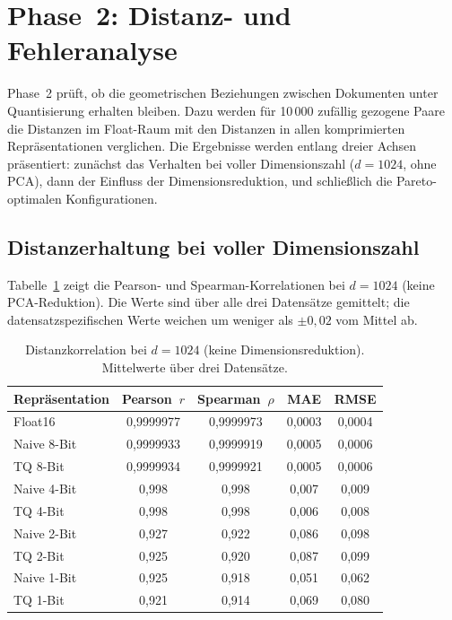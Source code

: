 \section{Phase~2: Distanz- und Fehleranalyse}
\label{sec:ergebnisse_phase2}
%
Phase~2 prüft, ob die geometrischen Beziehungen zwischen Dokumenten unter Quantisierung erhalten bleiben.
Dazu werden für 10\,000 zufällig gezogene Paare die Distanzen im Float-Raum mit den Distanzen in allen komprimierten Repräsentationen verglichen.
Die Ergebnisse werden entlang dreier Achsen präsentiert: zunächst das Verhalten bei voller Dimensionszahl ($d = 1024$, ohne PCA), dann der Einfluss der Dimensionsreduktion, und schließlich die Pareto-optimalen Konfigurationen.
%
\subsection{Distanzerhaltung bei voller Dimensionszahl}
\label{sec:ergebnisse_phase2_fulldim}
%
Tabelle~\ref{tab:phase2_fulldim} zeigt die Pearson- und Spearman-Korrelationen bei $d = 1024$ (keine PCA-Reduktion).
Die Werte sind über alle drei Datensätze gemittelt; die datensatzspezifischen Werte weichen um weniger als $\pm 0{,}02$ vom Mittel ab.
%
\begin{table}[htbp]
  \centering
  \caption[Distanzkorrelation bei voller Dimensionszahl]{Distanzkorrelation bei $d = 1024$ (keine Dimensionsreduktion). Mittelwerte über drei Datensätze.}
  \label{tab:phase2_fulldim}
  \begin{tabular}{lcccc}
    \toprule
    Repräsentation & Pearson~$r$ & Spearman~$\rho$ & MAE & RMSE \\
    \midrule
    Float16         & 0{,}9999977 & 0{,}9999973 & 0{,}0003 & 0{,}0004 \\
    Naive 8-Bit     & 0{,}9999933 & 0{,}9999919 & 0{,}0005 & 0{,}0006 \\
    TQ 8-Bit        & 0{,}9999934 & 0{,}9999921 & 0{,}0005 & 0{,}0006 \\
    Naive 4-Bit     & 0{,}998      & 0{,}998      & 0{,}007  & 0{,}009  \\
    TQ 4-Bit        & 0{,}998      & 0{,}998      & 0{,}006  & 0{,}008  \\
    Naive 2-Bit     & 0{,}927      & 0{,}922      & 0{,}086  & 0{,}098  \\
    TQ 2-Bit        & 0{,}925      & 0{,}920      & 0{,}087  & 0{,}099  \\
    Naive 1-Bit     & 0{,}925      & 0{,}918      & 0{,}051  & 0{,}062  \\
    TQ 1-Bit        & 0{,}921      & 0{,}914      & 0{,}069  & 0{,}080  \\
    \bottomrule
  \end{tabular}
\end{table}
%

